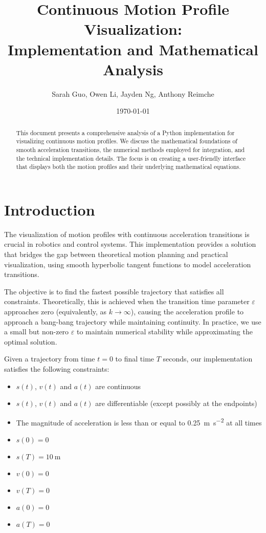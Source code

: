 \documentclass[12pt,a4paper]{article}
\title{Continuous Motion Profile Visualization:\\Implementation and Mathematical Analysis}
\author{Sarah Guo, Owen Li, Jayden Ng, Anthony Reimche}
\date{\today}
\begin{document}
\maketitle

\begin{abstract}
This document presents a comprehensive analysis of a Python implementation for visualizing continuous motion profiles. We discuss the mathematical foundations of smooth acceleration transitions, the numerical methods employed for integration, and the technical implementation details. The focus is on creating a user-friendly interface that displays both the motion profiles and their underlying mathematical equations.
\end{abstract}

\tableofcontents

\section{Introduction}
The visualization of motion profiles with continuous acceleration transitions is crucial in robotics and control systems. This implementation provides a solution that bridges the gap between theoretical motion planning and practical visualization, using smooth hyperbolic tangent functions to model acceleration transitions.

The objective is to find the fastest possible trajectory that satisfies all constraints. Theoretically, this is achieved when the transition time parameter $\varepsilon$ approaches zero (equivalently, as $k \to \infty$), causing the acceleration profile to approach a bang-bang trajectory while maintaining continuity. In practice, we use a small but non-zero $\varepsilon$ to maintain numerical stability while approximating the optimal solution.

Given a trajectory from time $t=0$ to final time $T$ seconds, our implementation satisfies the following constraints:

\begin{itemize}
\item $s(t)$, $v(t)$ and $a(t)$ are continuous
\item $s(t)$, $v(t)$ and $a(t)$ are differentiable (except possibly at the endpoints)
\item The magnitude of acceleration is less than or equal to \SI{0.25}{\meter\per\second\squared} at all times
\item $s(0) = 0$
\item $s(T) = \SI{10}{\meter}$
\item $v(0) = 0$
\item $v(T) = 0$
\item $a(0) = 0$
\item $a(T) = 0$
\end{itemize}
\end{document}
